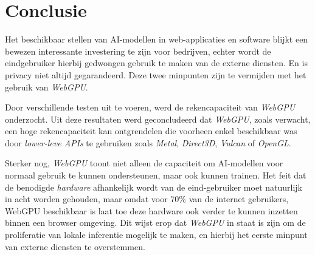 
\chapter{Conclusie}%
\label{ch:conclusie}





Het beschikbaar stellen van AI-modellen in web-applicaties en software blijkt een bewezen interessante investering te zijn voor bedrijven, echter wordt de eindgebruiker hierbij gedwongen gebruik te maken van de externe diensten. En is privacy niet altijd gegarandeerd. Deze twee minpunten zijn te vermijden met het gebruik van \textit{WebGPU}.

\bigbreak{}

Door verschillende testen uit te voeren, werd de rekencapaciteit van \textit{WebGPU} onderzocht. Uit deze resultaten werd geconcludeerd dat \textit{WebGPU}, zoals verwacht, een hoge rekencapaciteit kan ontgrendelen die voorheen enkel beschikbaar was door \textit{lower-leve APIs} te gebruiken zoals \textit{Metal}, \textit{Direct3D}, \textit{Vulcan} of \textit{OpenGL}.

\bigbreak{}

Sterker nog, \textit{WebGPU} toont niet alleen de capaciteit om  AI-modellen voor normaal gebruik te kunnen ondersteunen, maar ook kunnen trainen. Het feit dat de benodigde \textit{hardware} afhankelijk wordt van de eind-gebruiker moet natuurlijk in acht worden gehouden, maar omdat voor 70\% van de internet gebruikers, WebGPU beschikbaar is laat toe deze hardware ook verder te kunnen inzetten binnen een browser omgeving. Dit wijst erop dat \textit{WebGPU} in staat is zijn om de proliferatie van lokale inferentie mogelijk te maken, en hierbij het eerste minpunt van externe diensten te overstemmen.

